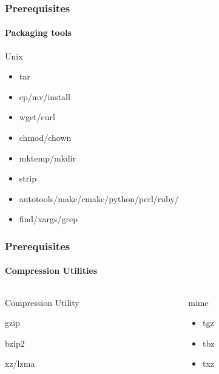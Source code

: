 \documentclass[1pt,hyperref={pdfpagelabels=true}]{beamer}
\begin{document}
\begin{frame}
  \frametitle{Prerequisites}
  \framesubtitle{Packaging tools}
  
  \begin{block}{Unix}
    \begin{itemize}[<+-| alert@+>]
    \item tar
    \item cp/mv/install
    \item wget/curl
    \item chmod/chown
    \item mktemp/mkdir
    \item strip
    \item autotools/make/cmake/python/perl/ruby/
    \item find/xargs/grep
    \end{itemize}
  \end{block}
  
\end{frame}

\begin{frame}
  \frametitle{Prerequisites}
  \framesubtitle{Compression Utilities}
  
  \begin{columns}
    \begin{column}{4cm}
      \begin{block}{Compression Utility}
        \begin{description}
        \item<1-> gzip
        \item<2-> bzip2
        \item<3-> xz/lzma
        \end{description}
      \end{block}
    \end{column}

    \begin{column}{4cm}
      \begin{block}{mime}
        \begin{itemize}
        \item<1-> tgz
        \item<2-> tbz
        \item<3-> txz
        \end{itemize}
      \end{block}
    \end{column}
  \end{columns}
  
\end{frame}
\end{document}
